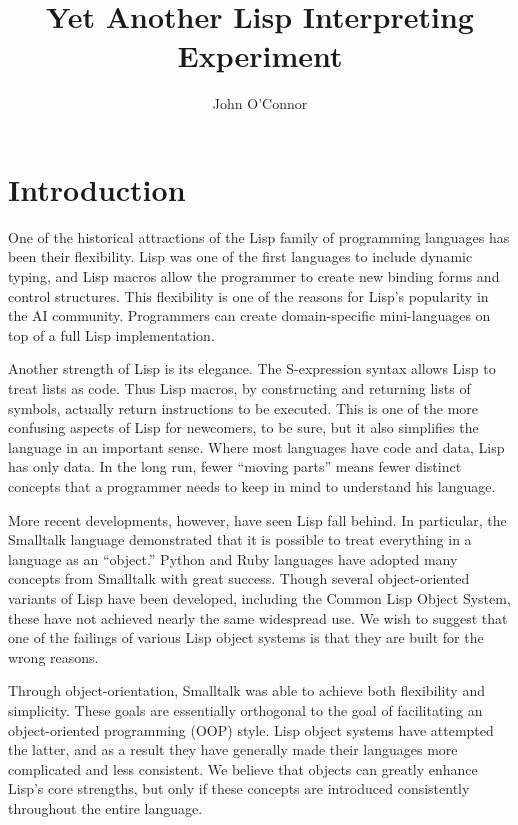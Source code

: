 \documentclass[twocolumn]{article}
\title{Yet Another Lisp Interpreting Experiment}
\author{John O'Connor}
\date{}
\begin{document}
\newcommand{\next}{\operatorname{next}}
\newcommand{\invoke}{\operatorname{invoke}}
\newcommand{\lookup}{\operatorname{lookup}}
\newcommand{\wrap}{\operatorname{wrap}}
\newcommand{\parse}{\operatorname{parse}}

\newcommand{\eval}{\texttt{eval}}
\newcommand{\call}{\texttt{call}}
\newcommand{\msg}{\texttt{msg}}

\newcommand{\lb}{\left<}
\newcommand{\rb}{\right>}

\maketitle

\section*{Introduction}
One of the historical attractions of the Lisp family of programming
languages has been their flexibility. Lisp was one of the first
languages to include dynamic typing, and Lisp macros allow the
programmer to create new binding forms and control structures. This
flexibility is one of the reasons for Lisp's popularity in the AI
community. Programmers can create domain-specific mini-languages
on top of a full Lisp implementation.

Another strength of Lisp is its elegance. The S-expression syntax
allows Lisp to treat lists as code. Thus Lisp macros, by constructing
and returning lists of symbols, actually return instructions to be
executed. This is one of the more confusing aspects of Lisp for
newcomers, to be sure, but it also simplifies the language in an
important sense. Where most languages have code and data, Lisp has
only data. In the long run, fewer ``moving parts'' means fewer
distinct concepts that a programmer needs to keep in mind to
understand his language.

More recent developments, however, have seen Lisp fall behind. In
particular, the Smalltalk language demonstrated that it is possible to
treat everything in a language as an ``object.'' Python and Ruby
languages have adopted many concepts from Smalltalk with great
success. Though several object-oriented variants of Lisp have been
developed, including the Common Lisp Object System, these have not
achieved nearly the same widespread use. We wish to suggest that one
of the failings of various Lisp object systems is that they are built
for the wrong reasons.

Through object-orientation, Smalltalk was able to achieve both
flexibility and simplicity. These goals are essentially orthogonal to
the goal of facilitating an object-oriented programming (OOP)
style. Lisp object systems have attempted the latter, and as a result
they have generally made their languages more complicated and less
consistent. We believe that objects can greatly enhance Lisp's core
strengths, but only if these concepts are introduced consistently
throughout the entire language.
\end{document}

